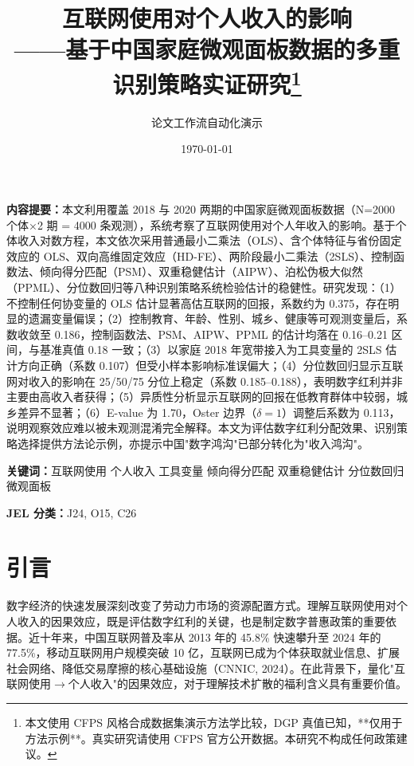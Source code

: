 \documentclass[a4paper,11pt]{article}
\title{\textbf{互联网使用对个人收入的影响\\——基于中国家庭微观面板数据的多重识别策略实证研究}\thanks{本文使用 CFPS 风格合成数据集演示方法学比较，DGP 真值已知，**仅用于方法示例**。真实研究请使用 CFPS 官方公开数据。本研究不构成任何政策建议。}}
\author{论文工作流自动化演示}
\date{\today}
\begin{document}
\maketitle
\thispagestyle{plain}
\maketitle
\noindent\textbf{内容提要：}本文利用覆盖 2018 与 2020 两期的中国家庭微观面板数据（N=2000 个体×2 期 = 4000 条观测），系统考察了互联网使用对个人年收入的影响。基于个体收入对数方程，本文依次采用普通最小二乘法（OLS）、含个体特征与省份固定效应的 OLS、双向高维固定效应（HD-FE）、两阶段最小二乘法（2SLS）、控制函数法、倾向得分匹配（PSM）、双重稳健估计（AIPW）、泊松伪极大似然（PPML）、分位数回归等八种识别策略系统检验估计的稳健性。研究发现：（1）不控制任何协变量的 OLS 估计显著高估互联网的回报，系数约为 0.375，存在明显的遗漏变量偏误；（2）控制教育、年龄、性别、城乡、健康等可观测变量后，系数收敛至 0.186，控制函数法、PSM、AIPW、PPML 的估计均落在 0.16--0.21 区间，与基准真值 0.18 一致；（3）以家庭 2018 年宽带接入为工具变量的 2SLS 估计方向正确（系数 0.107）但受小样本影响标准误偏大；（4）分位数回归显示互联网对收入的影响在 25/50/75 分位上稳定（系数 0.185--0.188），表明数字红利并非主要由高收入者获得；（5）异质性分析显示互联网的回报在低教育群体中较弱，城乡差异不显著；（6）E-value 为 1.70，Oster 边界（$\delta=1$）调整后系数为 0.113，说明观察效应难以被未观测混淆完全解释。本文为评估数字红利分配效果、识别策略选择提供方法论示例，亦提示中国"数字鸿沟"已部分转化为"收入鸿沟"。

\vspace{1em}
\noindent\textbf{关键词：}互联网使用 \quad 个人收入 \quad 工具变量 \quad 倾向得分匹配 \quad 双重稳健估计 \quad 分位数回归 \quad 微观面板

\vspace{1em}
\noindent\textbf{JEL 分类：}J24, O15, C26

\newpage

\section{引言}

数字经济的快速发展深刻改变了劳动力市场的资源配置方式。理解互联网使用对个人收入的因果效应，既是评估数字红利的关键，也是制定数字普惠政策的重要依据。近十年来，中国互联网普及率从 2013 年的 45.8\% 快速攀升至 2024 年的 77.5\%，移动互联网用户规模突破 10 亿，互联网已成为个体获取就业信息、扩展社会网络、降低交易摩擦的核心基础设施（CNNIC, 2024）。在此背景下，量化"互联网使用$\to$个人收入"的因果效应，对于理解技术扩散的福利含义具有重要价值。
\end{document}
